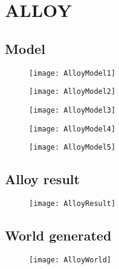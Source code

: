 \section{ALLOY}
\subsection{Model}
\begin{figure}[H]
	\centering
	\texttt{[image: AlloyModel1]}
\end{figure}
\begin{figure}[H]
	\centering
	\texttt{[image: AlloyModel2]}
\end{figure}
\begin{figure}[H]
	\centering
	\texttt{[image: AlloyModel3]}
\end{figure}
\begin{figure}[H]
	\centering
	\texttt{[image: AlloyModel4]}
\end{figure}
\begin{figure}[H]
	\centering
	\texttt{[image: AlloyModel5]}
\end{figure}
\subsection{Alloy result}
\begin{figure}[H]
	\centering
	\texttt{[image: AlloyResult]}
\end{figure}
\subsection{World generated}
\begin{figure}[H]
	\centering
	\texttt{[image: AlloyWorld]}
\end{figure}